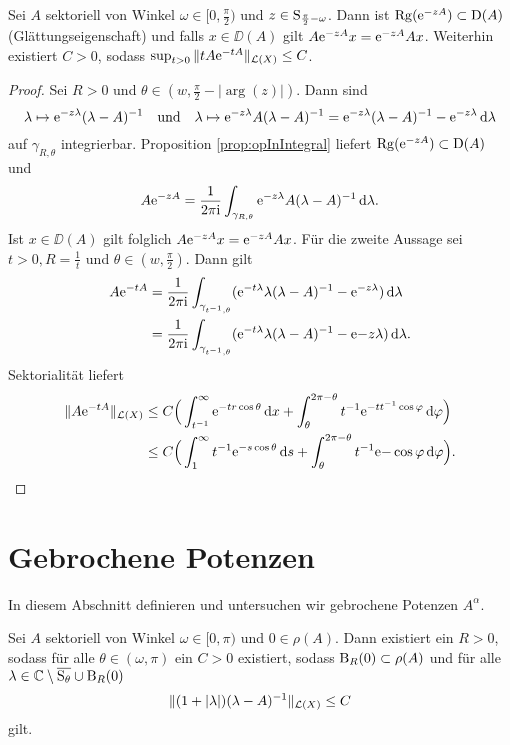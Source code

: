 \begin{thm}
  Sei $A$ sektoriell von Winkel $\omega \in [0,\frac{\pi}{2})$ und $z \in \mathrm{S}_{\frac{\pi}{2} - \omega}$.
    Dann ist $\operatorname{Rg}(\mathrm{e}^{-zA}) \subset \mathrm{D}(A)$ (Glättungseigenschaft) und falls $x \in \DD(A)$ gilt $A \mathrm{e}^{-zA} x = \mathrm{e}^{-z A} A x$.
    Weiterhin existiert $C > 0$, sodass $\sup_{t > 0} \|t A \mathrm{e}^{-t A} \|_{\mathcal{L}(X)} \leq C$.
\end{thm}

\begin{proof}
  Sei $R > 0$ und $\theta \in (w, \frac{\pi}{2} - |\arg(z)|)$.
  Dann sind
  $$
  \lambda \mapsto \mathrm{e}^{-z\lambda}(\lambda - A)^{-1} \quad\text{und}\quad \lambda \mapsto \mathrm{e}^{-z\lambda} A(\lambda - A)^{-1} = \mathrm{e}^{-z\lambda} (\lambda - A)^{-1} - \mathrm{e}^{-z\lambda} \, {\operatorname{d}\!{\lambda}}
  $$
  auf $\gamma_{R,\theta}$ integrierbar.
  Proposition \ref{prop:opInIntegral} liefert $\operatorname{Rg}(\mathrm{e}^{-zA}) \subset \mathrm{D}(A)$ und 
  $$
  A \mathrm{e}^{-zA} = \frac{1}{2\pi \mathrm{i}} \int_{\gamma_{R,\theta}} \mathrm{e}^{-z\lambda} A(\lambda - A)^{-1} \, {\operatorname{d}\!{\lambda}}.
  $$
  Ist $x \in \DD(A)$ gilt folglich $A \mathrm{e}^{-zA} x = \mathrm{e}^{-z A} A x$.
  Für die zweite Aussage sei $t > 0,  R = \frac{1}{t}$ und $\theta \in (w, \frac{\pi}{2})$.
  Dann gilt
  \begin{align*}
    A \mathrm{e}^{-tA}
    &= \frac{1}{2 \pi \mathrm{i}} \int_{\gamma_{t^{-1},\theta}} (\mathrm{e}^{-t\lambda}\lambda (\lambda - A)^{-1} - \mathrm{e}^{-z\lambda}) \, {\operatorname{d}\!{\lambda}} \\
    &= \frac{1}{2 \pi \mathrm{i}} \int_{\gamma_{t^{-1},\theta}} (\mathrm{e}^{-t\lambda} \lambda (\lambda - A)^{-1} - \mathrm{e}{-z\lambda}) \, {\operatorname{d}\!{\lambda}}.
  \end{align*}
  Sektorialität liefert
  \begin{align*}
    \| A \mathrm{e}^{-t A} \|_{\mathcal{L}(X)}
    &\leq C \Big( \int_{t^{-1}}^\infty \mathrm{e}^{-tr \cos \theta} \, {\operatorname{d}\!{x}} + \int_\theta^{2\pi - \theta} t^{-1} \mathrm{e}^{-t t^{-1} \cos \varphi} \, {\operatorname{d}\!{\varphi}}\Big) \\
    &\leq C \Big( \int_1^\infty t^{-1} \mathrm{e}^{-s\cos \theta} \, {\operatorname{d}\!{s}} + \int_\theta^{2\pi - \theta} t^{-1} \mathrm{e}{-\cos \varphi} \, {\operatorname{d}\!{\varphi}} \Big). \qedhere
  \end{align*}
\end{proof}

\section{Gebrochene Potenzen}

In diesem Abschnitt definieren und untersuchen wir gebrochene Potenzen $A^\alpha$.

\begin{prop}
  \label{prop:resolventEstImproved}
  Sei $A$ sektoriell von Winkel $\omega \in [0,\pi)$ und $0 \in \rho(A)$.
    Dann existiert ein $R > 0$, sodass für alle $\theta \in (\omega, \pi)$ ein $C > 0$ existiert, sodass $\mathrm{B}_R(0) \subset \rho(A)$ und für alle $\lambda \in \mathbb{C} \setminus \overline{\mathrm{S}_\theta} \cup \mathrm{B}_R(0)$
    $$
    \| (1 + |\lambda| ) (\lambda - A)^{-1} \|_{\mathcal{L}(X)} \leq C
    $$
    gilt.
\end{prop}

